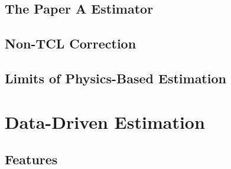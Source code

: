 \documentclass[9pt,journal,a4paper]{IEEEtran}
\begin{document}
\subsection{The Paper A Estimator}

\subsection{Non-TCL Correction}

\subsection{Limits of Physics-Based Estimation}

\section{Data-Driven Estimation}
\label{sec:datadriven}

\subsection{Features}
\end{document}
